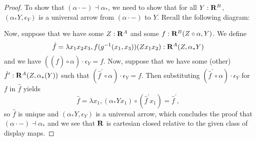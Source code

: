 \begin{proof}
  To show that $ (\alpha \cdot -) \dashv \alpha_* $, we need to show that for all $ Y : \mathbf{R}^B $, $ (\alpha_* Y, \epsilon_Y) $ is a universal arrow from $ (\alpha \cdot -) $ to $ Y $. Recall the following diagram:
  \begin{center}
  \end{center}
  Now, suppose that we have some $ Z : \mathbf{R}^A $ and some $ f: \mathbf{R}^B(Z \circ \alpha, Y) $. We define
  \[ \hat f = \lambda x_1 x_2 x_3, f(g^{-1}(x_1, x_3)) (Z x_1 x_2): \mathbf{R}^A(Z, \alpha_* Y) \]
  and we have $ ((\hat f) \circ \alpha) \cdot \epsilon_Y = f $.
  Now, suppose that we have some (other) $ \hat f^\prime : \mathbf{R}^A(Z, \alpha_*(Y)) $ such that $ (\hat f^\prime \circ \alpha) \cdot \epsilon_Y = f $. Then substituting $ (\hat f^\prime \circ \alpha) \cdot \epsilon_Y $ for $ f $ in $ \hat f $ yields
  \[ \hat f = \lambda x_1, (\alpha_* Y x_1) \circ (\hat f^\prime x_1) = \hat f^\prime, \]
  so $ \hat f $ is unique and $ (\alpha_* Y, \epsilon_Y) $ is a universal arrow, which concludes the proof that $ (\alpha \cdot -) \dashv \alpha_* $ and we see that $ \mathbf{R} $ is cartesian closed relative to the given class of display maps.

\end{proof}
